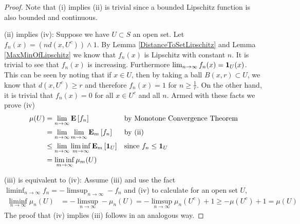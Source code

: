 \begin{proof}
Note that (i) implies (ii) is trivial since a bounded Lipschitz
function is also bounded and continuous.

(ii) implies (iv): Suppose we have $U \subset S$ an open set.  Let
$f_n(x) = (nd(x,U^c)) \wedge 1$.  By Lemma \ref{DistanceToSetLipschitz}
and Lemma \ref{MaxMinOfLipschitz} we know that $f_n(x)$ is Lipschitz with
constant $n$.  It is trivial to see that $f_n(x)$ is 
increasing.  Furthermore $\lim_{n \to \infty}
f_n(x) = \characteristic{U}(x)$.  This can be seen by noting that if $x \in U$, then by taking a
ball $B(x,r) \subset U$, we know that $d(x, U^c) \geq r$ and therefore
$f_n(x) = 1$ for $n \geq \frac{1}{r}$.  On the other hand, it is
trivial that $f_n(x) = 0$ for all $x \in U^c$ and all $n$.  Armed with
these facts we prove (iv)
\begin{align*}
\mu(U) &= \lim_{n \to  \infty}\expectation{f_n}  & & \text{by
  Monotone Convergence Theorem}\\
&= \lim_{n \to  \infty} \lim_{m \to  \infty} \sexpectation{f_n}{m} & &
\text{by (ii)}\\
&\leq \lim_{n \to  \infty} \liminf_{m \to  \infty}
\sexpectation{\characteristic{U}}{m}  & & \text{since $f_n \leq \characteristic{U}$}\\
&= \liminf_{m \to  \infty} \mu_m(U)\\
\end{align*}

(iii) is equivalent to (iv): Assume (iii) and use the fact $\liminf_{n \to \infty}
f_n = -\limsup_{n \to \infty} -f_n$ and (iv) to calculate for an open set $U$,
\begin{align*}
\liminf_{n \to \infty} \mu_n(U) &= -\limsup_{n \to \infty} -\mu_n(U) = -\limsup_{n \to \infty} \mu_n(U^c) + 1 \geq -\mu(U^c) + 1 = \mu(U)
\end{align*}
The proof that (iv) implies (iii) follows in an analogous way.


\end{proof}
